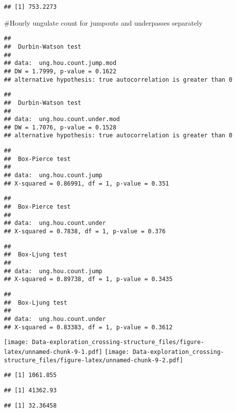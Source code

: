 \documentclass[]{article}
\begin{document}
\begin{verbatim}
## [1] 753.2273
\end{verbatim}

\#Hourly ungulate count for jumpouts and underpasses separately

\begin{verbatim}
## 
##  Durbin-Watson test
## 
## data:  ung.hou.count.jump.mod
## DW = 1.7999, p-value = 0.1622
## alternative hypothesis: true autocorrelation is greater than 0
\end{verbatim}

\begin{verbatim}
## 
##  Durbin-Watson test
## 
## data:  ung.hou.count.under.mod
## DW = 1.7076, p-value = 0.1528
## alternative hypothesis: true autocorrelation is greater than 0
\end{verbatim}

\begin{verbatim}
## 
##  Box-Pierce test
## 
## data:  ung.hou.count.jump
## X-squared = 0.86991, df = 1, p-value = 0.351
\end{verbatim}

\begin{verbatim}
## 
##  Box-Pierce test
## 
## data:  ung.hou.count.under
## X-squared = 0.7838, df = 1, p-value = 0.376
\end{verbatim}

\begin{verbatim}
## 
##  Box-Ljung test
## 
## data:  ung.hou.count.jump
## X-squared = 0.89738, df = 1, p-value = 0.3435
\end{verbatim}

\begin{verbatim}
## 
##  Box-Ljung test
## 
## data:  ung.hou.count.under
## X-squared = 0.83383, df = 1, p-value = 0.3612
\end{verbatim}

\texttt{[image: Data-exploration\_crossing-structure\_files/figure-latex/unnamed-chunk-9-1.pdf]}
\texttt{[image: Data-exploration\_crossing-structure\_files/figure-latex/unnamed-chunk-9-2.pdf]}

\begin{verbatim}
## [1] 1061.855
\end{verbatim}

\begin{verbatim}
## [1] 41362.93
\end{verbatim}

\begin{verbatim}
## [1] 32.36458
\end{verbatim}
\end{document}
